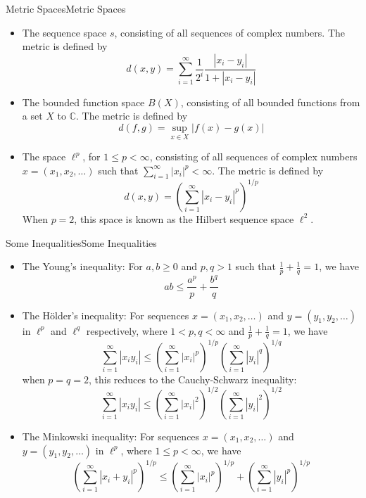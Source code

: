 \documentclass[../main.tex]{subfiles}
\begin{document}
\begin{example}{Metric Spaces}{Metric Spaces}
\begin{itemize}
		where $\mathbb{1}_{\{\cdot\}}$ is the indicator function.
	\item The sequence space $s$, consisting of all sequences of complex numbers. The metric is defined by
		\begin{equation*}
			d(x, y) = \sum_{i=1}^\infty \frac{1}{2^i} \frac{|x_i - y_i|}{1 + |x_i - y_i|}
		\end{equation*}
	\item The bounded function space $B(X)$, consisting of all bounded functions from a set $X$ to $\mathbb{C}$. The metric is defined by
		\begin{equation*}
			d(f, g) = \sup_{x \in X} |f(x) - g(x)|
		\end{equation*}
	\item The space $\ell^p$, for $1 \leq p < \infty$, consisting of all sequences of complex numbers $x = (x_1, x_2, \ldots)$ such that $\sum_{i=1}^\infty |x_i|^p < \infty$. The metric is defined by
		\begin{equation*}
			d(x, y) = \left( \sum_{i=1}^\infty |x_i - y_i|^p \right)^{1/p}
		\end{equation*}
		When $p = 2$, this space is known as the Hilbert sequence space $\ell^2$.
\end{itemize}
\end{example}

\begin{proposition}{Some Inequalities}{Some Inequalities}
\begin{itemize}
	\item The Young's inequality: For $a, b \geq 0$ and $p, q > 1$ such that $\frac{1}{p} + \frac{1}{q} = 1$, we have
		\begin{equation*}
			ab \leq \frac{a^p}{p} + \frac{b^q}{q}
		\end{equation*}
	\item The H\"older's inequality: For sequences $x = (x_1, x_2, \ldots)$ and $y = (y_1, y_2, \ldots)$ in $\ell^p$ and $\ell^q$ respectively, where $1 < p, q < \infty$ and $\frac{1}{p} + \frac{1}{q} = 1$, we have
		\begin{equation*}
			\sum_{i=1}^\infty |x_i y_i| \leq \left( \sum_{i=1}^\infty |x_i|^p \right)^{1/p} \left( \sum_{i=1}^\infty |y_i|^q \right)^{1/q}
		\end{equation*}
		when $p=q=2$, this reduces to the Cauchy-Schwarz inequality:
		\begin{equation*}
			\sum_{i=1}^\infty |x_i y_i| \leq \left( \sum_{i=1}^\infty |x_i|^2 \right)^{1/2} \left( \sum_{i=1}^\infty |y_i|^2 \right)^{1/2}
		\end{equation*}
	\item The Minkowski inequality: For sequences $x = (x_1, x_2, \ldots)$ and $y = (y_1, y_2, \ldots)$ in $\ell^p$, where $1 \leq p < \infty$, we have
		\begin{equation*}
			\left( \sum_{i=1}^\infty |x_i + y_i|^p \right)^{1/p} \leq \left( \sum_{i=1}^\infty |x_i|^p \right)^{1/p} + \left( \sum_{i=1}^\infty |y_i|^p \right)^{1/p}
		\end{equation*}
\end{itemize}
\end{proposition}
\end{document}
